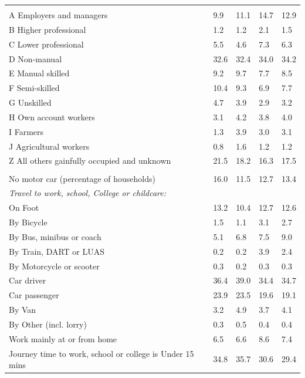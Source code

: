 \documentclass{article}
\begin{document}
\begin{table}[h]
\begin{tabular}{KTTTT}
\hline
    \\ 
    \hline
A Employers and managers &  9.9& 11.1& 14.7& 12.9\\
B Higher professional & 1.2& 1.2& 2.1& 1.5\\
C Lower professional & 5.5& 4.6& 7.3& 6.3\\
D Non-manual & 32.6& 32.4& 34.0& 34.2\\
E Manual skilled & 9.2& 9.7& 7.7& 8.5\\
F Semi-skilled & 10.4&  9.3&  6.9&  7.7\\
G Unskilled & 4.7& 3.9& 2.9& 3.2\\
H Own account workers & 3.1& 4.2& 3.8& 4.0\\
I Farmers & 1.3& 3.9& 3.0& 3.1\\
J Agricultural workers & 0.8& 1.6& 1.2& 1.2\\
Z All others gainfully occupied and unknown & 21.5& 18.2& 16.3& 17.5\\
\hline
{}\hline
    \\ 
    \hline
No motor car (percentage of households) & 16.0& 11.5& 12.7& 
13.4\\
    \hline 
\emph{Travel to work, school, College or childcare:} & & & \\
\quad On Foot & 13.2& 10.4& 12.7& 12.6\\ 
\quad By Bicycle & 1.5& 1.1& 3.1& 2.7\\ 
\quad By Bus, minibus or coach & 5.1& 6.8& 7.5& 9.0\\
\quad By Train, DART or LUAS & 0.2& 0.2& 3.9& 2.4\\
\quad By Motorcycle or scooter & 0.3& 0.2& 0.3& 0.3\\
\quad Car driver & 36.4 & 39.0& 34.4& 34.7\\
\quad Car passenger & 23.9& 23.5& 19.6& 19.1\\
\quad By Van & 3.2& 4.9& 3.7& 4.1\\
\quad By Other (incl. lorry) & 0.3& 0.5& 0.4& 0.4\\
    \hline
Work mainly at or from home & 6.5& 6.6& 8.6& 7.4\\
Journey time to work, school or college is Under 15 mins & 34.8& 35.7& 30.6& 29.4\\

\end{tabular}
\end{table}
\end{document}
